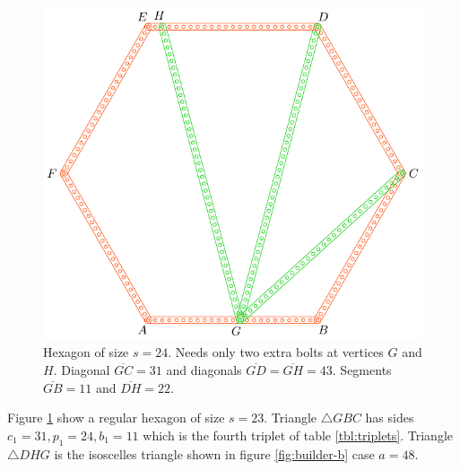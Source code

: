 \documentclass[11pt]{article}
\begin{document}
\begin{figure}[H]
\centering
\includegraphics[scale=1]{24/hexa-24a}
\caption{Hexagon of size $s = 24$. Needs only two extra bolts at vertices $G$ and $H$. Diagonal $\overline{GC} = 31$ and diagonals $\overline{GD} = \overline{GH} = 43$. Segments $\overline{GB} = 11$ and $\overline{DH} = 22$.}
\label{fig:24a}
\end{figure}

Figure \ref{fig:24a} show a regular hexagon of size $s = 23$. Triangle $\triangle{GBC}$ has sides $c_1=31, p_1=24, b_1=11$ which is the fourth triplet of table \ref{tbl:triplets}. Triangle $\triangle{DHG}$ is the isoscelles triangle shown in figure \ref{fig:builder-b} case $a=48$.
\end{document}

